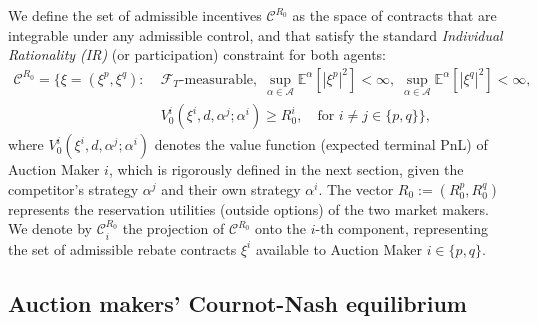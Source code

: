 \documentclass[12pt]{article}
\def \Z{\mathbb{Z}}
\begin{document}
We define the set of admissible incentives $\mathcal{C}^{R_0}$ as the space of contracts that are integrable under any admissible control, and that satisfy the standard \textit{Individual Rationality (IR)} (or participation) constraint for both agents:
\begin{align*}
\mathcal{C}^{R_0} = \Bigg\{ \xi = (\xi^p, \xi^q): \;& \mathcal{F}_T\text{-measurable}, \; \sup_{\alpha \in \mathcal{A}} \mathbb{E}^{\alpha}[|\xi^p|^2] < \infty, \; \sup_{\alpha \in \mathcal{A}} \mathbb{E}^{\alpha}[|\xi^q|^2] < \infty, \\
& V^i_0(\xi^i, d, \alpha^j; \alpha^i) \geq R_0^i, \quad \text{for } i \neq j \in \{p,q\} \Bigg\},
\end{align*}
where $V^i_0(\xi^i,d,\alpha^j; \alpha^i)$ denotes the value function (expected terminal PnL) of Auction Maker $i$, which is rigorously defined in the next section, given the competitor's strategy $\alpha^j$ and their own strategy $\alpha^i$. The vector $R_0 := (R_0^p, R_0^q)$ represents the reservation utilities (outside options) of the two market makers. We denote by $\mathcal{C}^{R_0}_i$ the projection of $\mathcal{C}^{R_0}$ onto the $i$-th component, representing the set of admissible rebate contracts $\xi^i$ available to Auction Maker $i \in \{p,q\}$.





\subsection{Auction makers' Cournot-Nash equilibrium}
\label{sec:agentprb}
\end{document}
